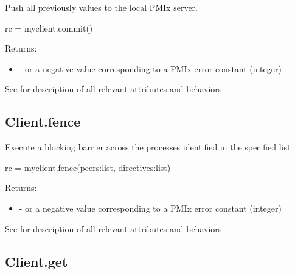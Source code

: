 \summary

Push all previously  values to the local PMIx server.

\format

\pyspecificstart
\begin{codepar}
rc = myclient.commit()
\end{codepar}
\pyspecificend

Returns:

\begin{itemize}
    \item {} -  or a negative value corresponding to a PMIx error constant (integer)
\end{itemize}


See  for description of all relevant attributes and behaviors


\subsection{Client.fence}

\summary

Execute a blocking barrier across the processes identified in the specified list

\format

\pyspecificstart
\begin{codepar}
rc = myclient.fence(peers:list, directives:list)
\end{codepar}
\pyspecificend

\begin{arglist}
\end{arglist}

Returns:

\begin{itemize}
    \item {} -  or a negative value corresponding to a PMIx error constant (integer)
\end{itemize}


See  for description of all relevant attributes and behaviors


\subsection{Client.get}


